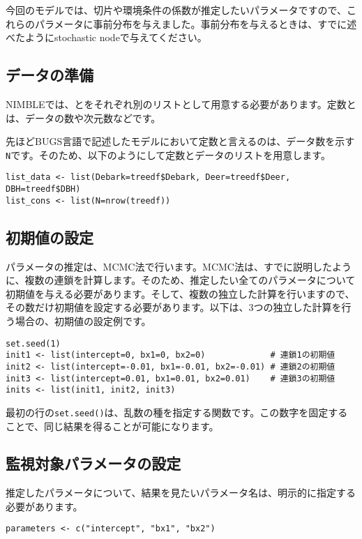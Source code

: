 今回のモデルでは、切片や環境条件の係数が推定したいパラメータですので、これらのパラメータに事前分布を与えました。事前分布を与えるときは、すでに述べたようにstochastic nodeで与えてください。

	\subsection{データの準備}
NIMBLEでは、とをそれぞれ別のリストとして用意する必要があります。定数とは、データの数や次元数などです。

先ほどBUGS言語で記述したモデルにおいて定数と言えるのは、データ数を示す\verb|N|です。そのため、以下のようにして定数とデータのリストを用意します。
\begin{verbatim}
list_data <- list(Debark=treedf$Debark, Deer=treedf$Deer, DBH=treedf$DBH)
list_cons <- list(N=nrow(treedf))
\end{verbatim}

	\subsection{初期値の設定}
パラメータの推定は、MCMC法で行います。MCMC法は、すでに説明したように、複数の連鎖を計算します。そのため、推定したい全てのパラメータについて初期値を与える必要があります。そして、複数の独立した計算を行いますので、その数だけ初期値を設定する必要があります。以下は、3つの独立した計算を行う場合の、初期値の設定例です。
\begin{verbatim}
set.seed(1)
init1 <- list(intercept=0, bx1=0, bx2=0)             # 連鎖1の初期値
init2 <- list(intercept=-0.01, bx1=-0.01, bx2=-0.01) # 連鎖2の初期値
init3 <- list(intercept=0.01, bx1=0.01, bx2=0.01)    # 連鎖3の初期値
inits <- list(init1, init2, init3)
\end{verbatim}
最初の行の\verb|set.seed()|は、乱数の種を指定する関数です。この数字を固定することで、同じ結果を得ることが可能になります。

	\subsection{監視対象パラメータの設定}
推定したパラメータについて、結果を見たいパラメータ名は、明示的に指定する必要があります。
\begin{verbatim}
parameters <- c("intercept", "bx1", "bx2")
\end{verbatim}

